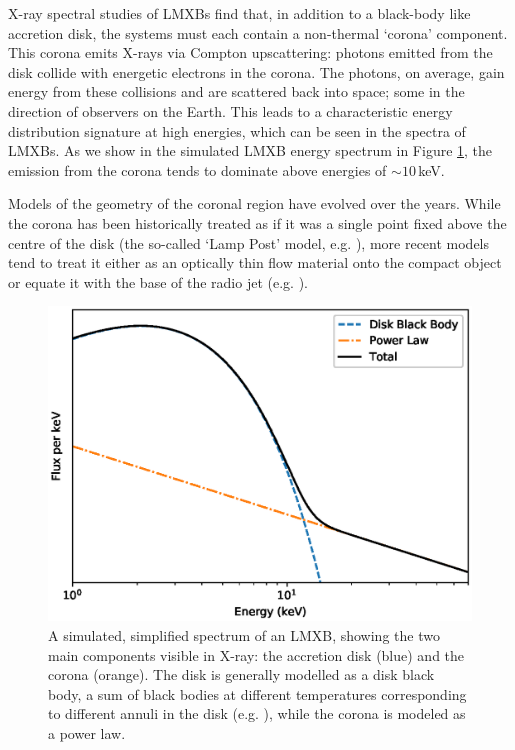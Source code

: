 \par X-ray spectral studies of LMXBs find that, in addition to a black-body like accretion disk, the systems must each contain a non-thermal `corona' component.  This corona emits X-rays via Compton upscattering: photons emitted from the disk collide with energetic electrons in the corona.  The photons, on average, gain energy from these collisions and are scattered back into space; some in the direction of observers on the Earth.  This leads to a characteristic energy distribution signature at high energies, which can be seen in the spectra of LMXBs.  As we show in the simulated LMXB energy spectrum in Figure \ref{fig:toyspec}, the emission from the corona tends to dominate above energies of $\sim10$\,keV.
\par Models of the geometry of the coronal region have evolved over the years.  While the corona has been historically treated as if it was a single point fixed above the centre of the disk (the so-called `Lamp Post' model, e.g. \citealp{Rozanska_Lamppost}), more recent models tend to treat it either as an optically thin flow material onto the compact object or equate it with the base of the radio jet (e.g. \citealp{Skipper_CoronaGeo}).

\begin{figure}
   \centering
    \includegraphics[width=0.7\columnwidth, trim = 10mm 0mm 10mm 10mm, clip]{images/toy_spec.eps}
    \captionsetup{singlelinecheck=off}
    \caption{A simulated, simplified spectrum of an LMXB, showing the two main components visible in X-ray: the accretion disk (blue) and the corona (orange).  The disk is generally modelled as a disk black body, a sum of black bodies at different temperatures corresponding to different annuli in the disk (e.g. \citealp{Mitsuda_diskbb}), while the corona is modeled as a power law.}
   \label{fig:toyspec}
\end{figure}

